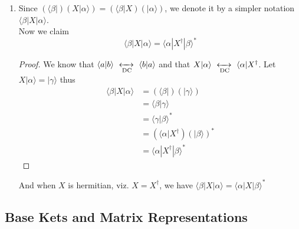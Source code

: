 \documentclass[12pt]{article}
\def\dc{\,\,\xleftrightarrow[\text{DC}]{}\,\,}
\def\bra#1{\langle#1|}
\def\ket#1{|#1 \rangle}
\def\inpr#1#2{\langle #1|#2 \rangle}
\def\braket#1#2#3{\langle#1|#2|#3\rangle}
\def\ha#1{#1^\dagger}
\begin{document}
\begin{enumerate}
\begin{enumerate}
						\end{enumerate}
					\item Since $(\bra \beta ) (X \ket \alpha ) = (\bra \beta X ) (\ket \alpha)$, we denote it by a simpler notation $\braket \beta X \alpha$.\\
					Now we claim 
					\begin{equation}
						\braket \beta X \alpha = \braket \alpha {\ha X} \beta ^*
						\label{hermitian_adjoint_operator}
					\end{equation}
					\begin{proof}
						We know that $\inpr a b \dc \inpr b a$ and that $X \ket \alpha \dc \bra \alpha \ha X$. Let $X \ket \alpha = \ket \gamma$ thus
						\begin{align*}
							\braket \beta X \alpha & = (\bra \beta) (\ket \gamma) \\
													& = \inpr \beta \gamma \\
													& = \inpr \gamma \beta ^* \\
													&= (\bra \alpha \ha X) (\ket \beta) ^* \\
													&= \braket \alpha {\ha X} \beta ^*
						\end{align*}
					\end{proof}
					And when $X$ is hermitian, viz. $X=\ha X$, we have $\braket \beta X \alpha = \braket \alpha X \beta ^*$
				\end{enumerate}
		\subsection {Base Kets and Matrix Representations}	
\end{document}
